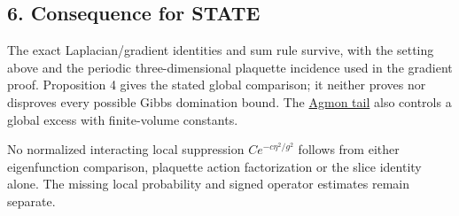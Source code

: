 \documentclass[11pt,a4paper]{article}
\begin{document}
\hypertarget{consequence-for-state}{%
\subsection{6. Consequence for STATE}\label{consequence-for-state}}

The exact Laplacian/gradient identities and sum rule survive, with the
setting above and the periodic three-dimensional plaquette incidence
used in the gradient proof. Proposition 4 gives the stated global
comparison; it neither proves nor disproves every possible Gibbs
domination bound. The \href{agmon-ground-state-suppression.md}{Agmon
tail} also controls a global excess with finite-volume constants.

No normalized interacting local suppression \(C e^{-c\eta^2/g^2}\)
follows from either eigenfunction comparison, plaquette action
factorization or the slice identity alone. The missing local probability
and signed operator estimates remain separate.
\end{document}
